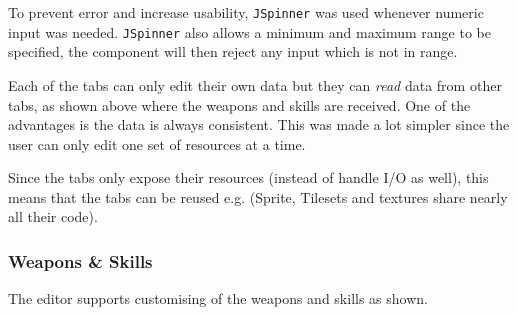 To prevent error and increase usability,  \texttt{JSpinner} was used whenever numeric input was needed. \texttt{JSpinner} also allows a minimum and maximum range to be specified,  the component will then reject any input which is not in range.

Each of the tabs can only edit their own data but they can \emph{read} data from other tabs, as shown above where the weapons and skills are received. One of the advantages is the data is always consistent. This was made a lot simpler since the user can only edit one set of resources at a time.

Since the tabs only expose their resources (instead of handle I/O as well),  this means that the tabs can be reused e.g. (Sprite, Tilesets and textures share nearly all their code).

\clearpage
\subsubsection{Weapons \& Skills}

The editor supports customising of the weapons and skills as shown. 

